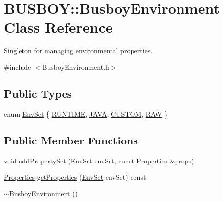 \hypertarget{classBUSBOY_1_1BusboyEnvironment}{
\section{BUSBOY::BusboyEnvironment Class Reference}
\label{classBUSBOY_1_1BusboyEnvironment}
}


Singleton for managing environmental properties.  


{\ttfamily \#include $<$BusboyEnvironment.h$>$}\subsection*{Public Types}
\begin{DoxyCompactItemize}
\item 
enum \hyperlink{classBUSBOY_1_1BusboyEnvironment_a1ff6c2014ac112710c1a91fcefd18f58}{EnvSet} \{ \hyperlink{classBUSBOY_1_1BusboyEnvironment_a1ff6c2014ac112710c1a91fcefd18f58a544ca0093b4f12e7ff75d8d26c2d503b}{RUNTIME}, 
\hyperlink{classBUSBOY_1_1BusboyEnvironment_a1ff6c2014ac112710c1a91fcefd18f58a435e5b0d187e37994ddb2211e5cb8529}{JAVA}, 
\hyperlink{classBUSBOY_1_1BusboyEnvironment_a1ff6c2014ac112710c1a91fcefd18f58aaeb8086d5c8ac6c14121d3d14440a5fe}{CUSTOM}, 
\hyperlink{classBUSBOY_1_1BusboyEnvironment_a1ff6c2014ac112710c1a91fcefd18f58af958bf56ea0a1945ce595a86ce0bd7c4}{RAW}
 \}
\end{DoxyCompactItemize}
\subsection*{Public Member Functions}
\begin{DoxyCompactItemize}
\item 
void \hyperlink{classBUSBOY_1_1BusboyEnvironment_a92aebf474cd88558005f88ec2738d622}{addPropertySet} (\hyperlink{classBUSBOY_1_1BusboyEnvironment_a1ff6c2014ac112710c1a91fcefd18f58}{EnvSet} envSet, const \hyperlink{classBUSBOY_1_1Properties}{Properties} \&props)
\item 
\hyperlink{classBUSBOY_1_1Properties}{Properties} \hyperlink{classBUSBOY_1_1BusboyEnvironment_a92b3d872e87465d4d566ef02d5a1a2c1}{getProperties} (\hyperlink{classBUSBOY_1_1BusboyEnvironment_a1ff6c2014ac112710c1a91fcefd18f58}{EnvSet} envSet) const 
\item 
\hyperlink{classBUSBOY_1_1BusboyEnvironment_a8612366d6249caecac58b1ea9f30e514}{$\sim$BusboyEnvironment} ()
\end{DoxyCompactItemize}
